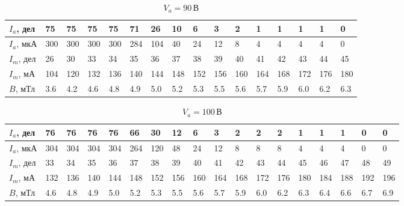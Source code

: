 \documentclass[a4paper,12pt]{article}
\begin{document}
\begin{enumerate}
		\begin{table}[h!]
			\caption{$V_a = 90 \, В$}
			\begin{center}
				\begin{tabular}{|*{16}{l|}} \hline
					$I_a$, дел & 75 & 75 & 75 &	75 & 71 & 26 & 10 & 6 & 3 & 2 & 1 & 1 & 1 & 1 & 0 \\ \hline
					$I_a$, мкА & 300 & 300 & 300 & 300 & 284 & 104 & 40 & 24 & 12 & 8 & 4 & 4 & 4 & 4 & 0 \\ \hline
					$I_m$, дел & 26 & 30 & 33 &	34 & 35 & 36 & 37 & 38 & 39 & 40 & 41 & 42 & 43 & 44 & 45 \\ \hline
					$I_m$, мА & 104 & 120 & 132 & 136 & 140 & 144 & 148 & 152 & 156 & 160 & 164 & 168 & 172 & 176 & 180 \\ \hline
					$B$, мТл & 3.6 & 4.2 & 4.6 & 4.8 & 4.9 & 5.0 & 5.2 & 5.3 & 5.5 & 5.6 & 5.7 & 5.9 & 6.0 & 6.2 & 6.3 \\ \hline
				\end{tabular}	
			\end{center}
		\end{table}
		
		\begin{table}[h!]
			\caption{$V_a = 100 \, В$}
			\begin{center}
				\begin{tabular}{|*{18}{l|}} \hline
					$I_a$, дел & 76 & 76 & 76 &	76 & 66 & 30 & 12 & 6 & 3 & 2 & 2 & 2 & 1 & 1 & 1 & 0 & 0 \\ \hline
					$I_a$, мкА & 304 & 304 & 304 & 304 & 264 & 120 & 48 & 24 & 12 & 8 & 8 & 8 & 4 & 4 & 4 & 0 & 0 \\ \hline
					$I_m$, дел & 33 & 34 & 35 &	36 & 37 & 38 & 39 & 40 & 41 & 42 & 43 & 44 & 45 & 46 & 47 & 48 & 49 \\ \hline
					$I_m$, мА & 132 & 136 & 140 & 144 & 148 & 152 & 156 & 160 & 164 & 168 & 172 & 176 & 180 & 184 & 188 & 192 & 196 \\ \hline
					$B$, мТл & 4.6 & 4.8 & 4.9 & 5.0 & 5.2 & 5.3 & 5.5 & 5.6 & 5.7 & 5.9 & 6.0 & 6.2 & 6.3 & 6.4 & 6.6 & 6.7 & 6.9\\ \hline
				\end{tabular}	
			\end{center}
		\end{table}


\end{enumerate}
\end{document}
